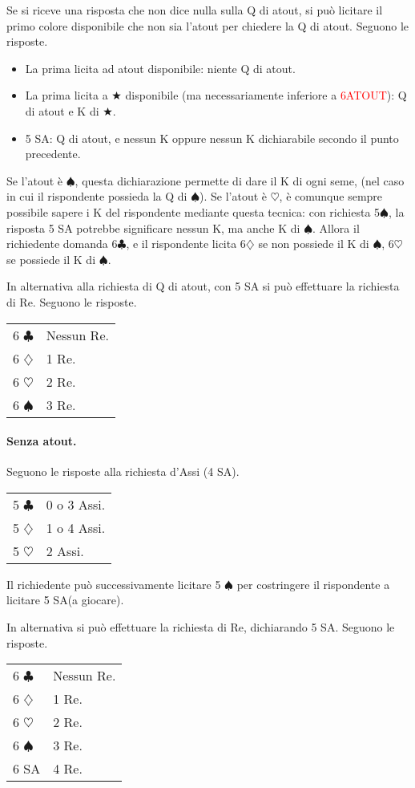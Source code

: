 \documentclass[a4paper,10pt]{article}
\renewcommand{\c}{$\clubsuit$\xspace}
\renewcommand{\d}{$\diamondsuit$\xspace}
\newcommand{\h}{$\heartsuit$\xspace}
\newcommand{\s}{$\spadesuit$\xspace}
\renewcommand{\j}{$\bigstar$\xspace}
\newcommand{\sa}{SA\xspace}
\newcommand{\smallspace}{\vskip0.3cm}
\newcommand{\note}[1]{\textcolor{red}{#1}}
\newenvironment{twocol}
  {\smallspace\noindent\begin{tabular}{l p{0.8\textwidth}}}
  {\end{tabular}\smallspace}
\begin{document}
\noindent Se si riceve una risposta che non dice nulla sulla Q di atout, si può licitare il primo colore disponibile che non sia l'atout per chiedere la Q di atout. Seguono le risposte.

\begin{itemize}
 \item La prima licita ad atout disponibile: niente Q di atout.
 \item La prima licita a \j disponibile (ma necessariamente inferiore a \note{6ATOUT}): Q di atout e K di \j.
 \item 5 \sa: Q di atout, e nessun K oppure nessun K dichiarabile secondo il punto precedente.
\end{itemize}

Se l'atout è \s, questa dichiarazione permette di dare il K di ogni seme, (nel caso in cui il rispondente possieda la Q di \s). Se l'atout è \h, è comunque sempre possibile sapere i K del rispondente mediante questa tecnica: con richiesta 5\s, la risposta 5 \sa potrebbe significare nessun K, ma anche K di \s.
Allora il richiedente domanda 6\c, e il rispondente licita 6\d se non possiede il K di \s, 6\h se possiede il K di \s.


\smallspace

\noindent In alternativa alla richiesta di Q di atout, con 5 \sa si può effettuare la richiesta di Re. Seguono le risposte.

\begin{twocol}
6 \c & Nessun Re.\\
6 \d & 1 Re.\\
6 \h & 2 Re.\\
6 \s & 3 Re. \\
\end{twocol}

\paragraph{Senza atout.} Seguono le risposte alla richiesta d'Assi (4 \sa).

\begin{twocol}
5 \c & 0 o 3 Assi.\\
5 \d & 1 o 4 Assi.\\
5 \h & 2 Assi.\\
\end{twocol}

\noindent Il richiedente può successivamente licitare 5 \s per costringere il rispondente a licitare 5 \sa (a giocare).

\smallspace

\noindent In alternativa si può effettuare la richiesta di Re, dichiarando 5 \sa. Seguono le risposte.

\begin{twocol}
6 \c & Nessun Re.\\
6 \d & 1 Re.\\
6 \h & 2 Re.\\
6 \s & 3 Re. \\
6 \sa & 4 Re.
\end{twocol}
\end{document}
